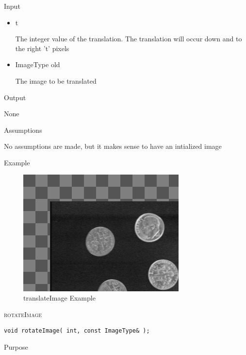 \documentclass[pdftex, 11pt]{article}
\begin{document}
\begin{description}
\begin{description}
			\item{Input}

				\begin{itemize}

					\item{t}

						The integer value of the translation. The
						translation will occur down and 
						to the right 't' pixels

					\item{ImageType old}

						The image to be translated

				\end{itemize}

			\item{Output}

				None

			\item{Assumptions}

				No assumptions are made, but it makes sense to have
				an intialized image

			\item{Example}

				\begin{figure}[h]
					\centering
					\caption{translateImage Example}
				\includegraphics{images/outtrans.png}
			\end{figure}

		\end{description}


	\item{\textsc{rotateImage}}
		\begin{description}

\begin{lstlisting}
void rotateImage( int, const ImageType& );
\end{lstlisting}

			\item{Purpose}


\end{description}
\end{description}
\end{document}
